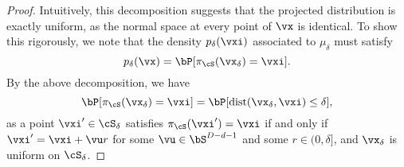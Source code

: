 \documentclass[../../book-main.tex]{subfiles}
\begin{document}
\begin{proof}
    Intuitively, this decomposition suggests that the projected distribution is
    exactly uniform, as the normal space at every point of $\vx$ is identical.
    To show this rigorously, we note that the density $p_{\delta}(\vxi)$
    associated to $\mu_{\delta}$ must satisfy
    \begin{equation}
        p_{\delta}(\vx) = \bP[ \pi_{\cS}(\vx_{\delta}) = \vxi ].
    \end{equation}
    By the above decomposition, we have
    \begin{equation}
        \bP[ \pi_{\cS}(\vx_{\delta}) = \vxi ]
        =
        \bP[ \dist(\vx_{\delta}, \vxi) \leq \delta ],
    \end{equation}
    as a point $\vxi' \in \cS_{\delta}$ satisfies $\pi_{\cS}(\vxi') = \vxi$ if
    and only if $\vxi' = \vxi + \vu r$ for some $\vu \in \bS^{D-d-1}$ and some
    $r \in (0, \delta]$, and $\vx_{\delta}$ is uniform on $\cS_{\delta}$.



\end{proof}
\end{document}
